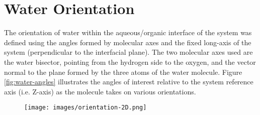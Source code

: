\section{Water Orientation}
The orientation of water within the aqueous/organic interface of the system was defined using the angles formed by molecular axes and the fixed long-axis of the system (perpendicular to the interfacial plane). The two molecular axes used are the water bisector, pointing from the hydrogen side to the oxygen, and the vector normal to the plane formed by the three atoms of the water molecule. Figure \ref{fig:water-angles} illustrates the angles of interest relative to the system reference axis (i.e. Z-axis) as the molecule takes on various orientations.


\begin{figure}[h!]
\begin{center}
	\texttt{[image: images/orientation-2D.png]}
	\caption{}
	\label{fig:system-orientations}
\end{center}
\end{figure}


